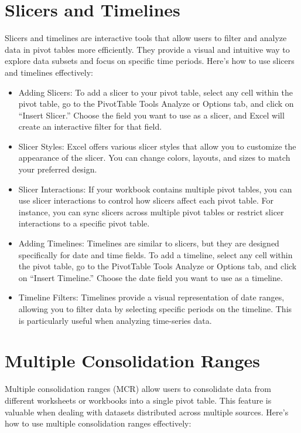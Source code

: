 \documentclass[
]{book}
\begin{document}
\hypertarget{slicers-and-timelines}{%
\section{Slicers and Timelines}\label{slicers-and-timelines}}

Slicers and timelines are interactive tools that allow users to filter and analyze data in pivot tables more efficiently. They provide a visual and intuitive way to explore data subsets and focus on specific time periods. Here's how to use slicers and timelines effectively:

\begin{itemize}
\item
  Adding Slicers: To add a slicer to your pivot table, select any cell within the pivot table, go to the PivotTable Tools Analyze or Options tab, and click on ``Insert Slicer.'' Choose the field you want to use as a slicer, and Excel will create an interactive filter for that field.
\item
  Slicer Styles: Excel offers various slicer styles that allow you to customize the appearance of the slicer. You can change colors, layouts, and sizes to match your preferred design.
\item
  Slicer Interactions: If your workbook contains multiple pivot tables, you can use slicer interactions to control how slicers affect each pivot table. For instance, you can sync slicers across multiple pivot tables or restrict slicer interactions to a specific pivot table.
\item
  Adding Timelines: Timelines are similar to slicers, but they are designed specifically for date and time fields. To add a timeline, select any cell within the pivot table, go to the PivotTable Tools Analyze or Options tab, and click on ``Insert Timeline.'' Choose the date field you want to use as a timeline.
\item
  Timeline Filters: Timelines provide a visual representation of date ranges, allowing you to filter data by selecting specific periods on the timeline. This is particularly useful when analyzing time-series data.
\end{itemize}

\hypertarget{multiple-consolidation-ranges}{%
\section{Multiple Consolidation Ranges}\label{multiple-consolidation-ranges}}

Multiple consolidation ranges (MCR) allow users to consolidate data from different worksheets or workbooks into a single pivot table. This feature is valuable when dealing with datasets distributed across multiple sources. Here's how to use multiple consolidation ranges effectively:
\end{document}
